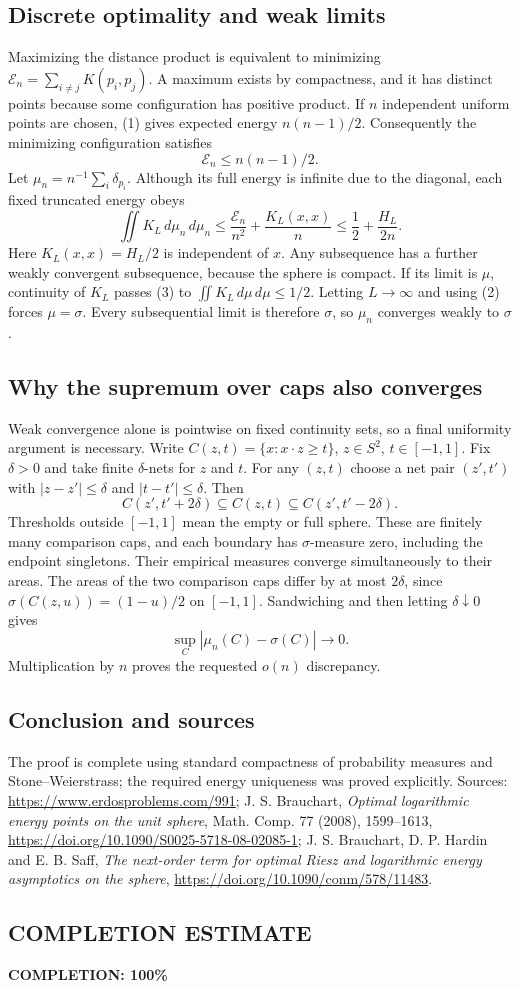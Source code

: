 \subsection*{Discrete optimality and weak limits}
Maximizing the distance product is equivalent to minimizing
$\mathcal E_n=\sum_{i\ne j}K(p_i,p_j)$.
A maximum exists by compactness, and it has distinct points because some configuration has positive product. If $n$ independent uniform points are chosen, (1) gives expected energy $n(n-1)/2$. Consequently the minimizing configuration satisfies
\[
 \mathcal E_n\le n(n-1)/2.
\]
Let $\mu_n=n^{-1}\sum_i\delta_{p_i}$. Although its full energy is infinite due to the diagonal, each fixed truncated energy obeys
\[
 \iint K_L\,d\mu_n\,d\mu_n
 \le\frac{\mathcal E_n}{n^2}+\frac{K_L(x,x)}n
 \le\frac12+\frac{H_L}{2n}.
 \tag{3}
\]
Here $K_L(x,x)=H_L/2$ is independent of $x$.
Any subsequence has a further weakly convergent subsequence, because the sphere is compact. If its limit is $\mu$, continuity of $K_L$ passes (3) to
$\iint K_L\,d\mu\,d\mu\le1/2$. Letting $L\to\infty$ and using (2) forces $\mu=\sigma$.
Every subsequential limit is therefore $\sigma$, so $\mu_n$ converges weakly to $\sigma$.

\subsection*{Why the supremum over caps also converges}
Weak convergence alone is pointwise on fixed continuity sets, so a final uniformity argument is necessary.
Write $C(z,t)=\{x:x\cdot z\ge t\}$, $z\in S^2$, $t\in[-1,1]$.
Fix $\delta>0$ and take finite $\delta$-nets for $z$ and $t$.
For any $(z,t)$ choose a net pair $(z',t')$ with
$|z-z'|\le\delta$ and $|t-t'|\le\delta$. Then
\[
 C(z',t'+2\delta)\subseteq C(z,t)\subseteq C(z',t'-2\delta).
\]
Thresholds outside $[-1,1]$ mean the empty or full sphere. These are finitely many comparison caps, and each boundary has $\sigma$-measure zero, including the endpoint singletons.
Their empirical measures converge simultaneously to their areas.
The areas of the two comparison caps differ by at most $2\delta$, since
$\sigma(C(z,u))=(1-u)/2$ on $[-1,1]$.
Sandwiching and then letting $\delta\downarrow0$ gives
\[
 \sup_C|\mu_n(C)-\sigma(C)|\longrightarrow0.
\]
Multiplication by $n$ proves the requested $o(n)$ discrepancy.

\subsection*{Conclusion and sources}
The proof is complete using standard compactness of probability measures and Stone--Weierstrass; the required energy uniqueness was proved explicitly. Sources: \url{https://www.erdosproblems.com/991}; J. S. Brauchart, \emph{Optimal logarithmic energy points on the unit sphere}, Math. Comp. 77 (2008), 1599--1613, \url{https://doi.org/10.1090/S0025-5718-08-02085-1}; J. S. Brauchart, D. P. Hardin and E. B. Saff, \emph{The next-order term for optimal Riesz and logarithmic energy asymptotics on the sphere}, \url{https://doi.org/10.1090/conm/578/11483}.
\subsection*{COMPLETION ESTIMATE}
\textbf{COMPLETION: 100\%}
